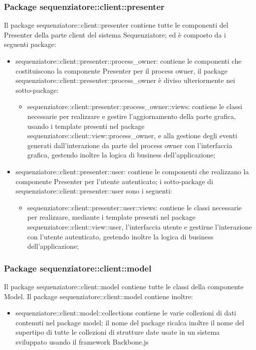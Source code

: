 \subsubsection{Package sequenziatore::client::presenter}
Il package sequenziatore::client::presenter contiene tutte le componenti del Presenter della parte client del sistema Sequenziatore; ed è composto da i seguenti package:
\begin{itemize}
	\item sequenziatore::client::presenter::process_owner: contiene le componenti che costituiscono la componente Presenter
per il process owner, il package sequenziatore::client::presenter::process_owner è diviso ulteriormente nei sotto-package:
	\begin{itemize}
		\item sequenziatore::client::presenter::process_owner::views: contiene le classi necessarie per realizzare e gestire l'aggiornamento della parte grafica, usando i template presenti nel package sequenziatore::client::view::process_owner, e alla gestione degli eventi generati dall'interazione da parte del process owner con l'interfaccia grafica, gestendo inoltre la logica di business dell'applicazione;
	\end{itemize}
	\item sequenziatore::client::presenter::user: contiene le componenti che realizzano la componente Presenter per l'utente autenticato; i sotto-package di sequenziatore::client::presenter::user sono i seguenti:
	\begin{itemize}
		\item sequenziatore::client::presenter::user::views: contiene le classi necessarie per realizzare, mediante i template presenti nel package sequenziatore::client::view::user, l'interfaccia utente e gestirne l'interazione con l'utente autenticato, gestendo inoltre la logica di business dell'applicazione;
	\end{itemize}
\end{itemize}
\subsubsection{Package sequenziatore::client::model}
Il package sequenziatore::client::model contiene tutte le classi della componente Model. 
Il package sequenziatore::client::model contiene inoltre:
\begin{itemize}
	\item sequenziatore::client::model::collections contiene le varie collezioni di dati contenuti nel package model; il nome del package ricalca inoltre il nome del supertipo di tutte le collezioni di strutture date usate in un sistema sviluppato usando il framework Backbone.js
\end{itemize}
